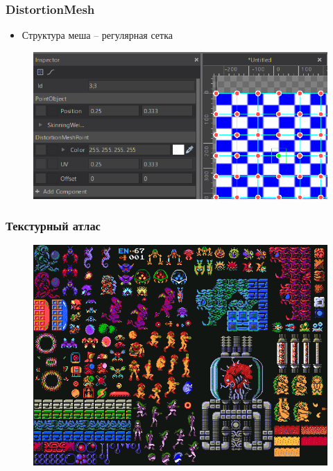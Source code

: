 \documentclass[10pt, unicode]{beamer}
\begin{document}
    \begin{frame}
        \frametitle{DistortionMesh}
        \begin{itemize}
            \item Структура меша -- регулярная сетка
        \end{itemize}
        \begin{figure}
            \centering
            \includegraphics[scale=0.5]{DistortionMesh.png}
        \end{figure}
    \end{frame}
    \begin{frame}
        \frametitle{Текстурный атлас}
        \begin{figure}[H]
            \includegraphics[width = 0.9\linewidth, keepaspectratio]{TextureAtlas.png}
        \end{figure}
    \end{frame}
\end{document}
